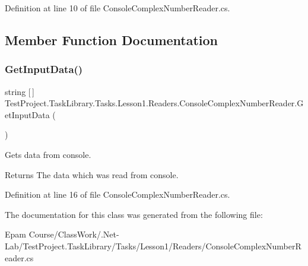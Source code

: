 Definition at line 10 of file Console\+Complex\+Number\+Reader.\+cs.



\subsection{Member Function Documentation}
\mbox{\label{class_test_project_1_1_task_library_1_1_tasks_1_1_lesson1_1_1_readers_1_1_console_complex_number_reader_aab6af1e87e0e2b0744c86baa86fe7da7}} 
\subsubsection{\texorpdfstring{GetInputData()}{GetInputData()}}
{\footnotesize\ttfamily string \mbox{[}$\,$\mbox{]} Test\+Project.\+Task\+Library.\+Tasks.\+Lesson1.\+Readers.\+Console\+Complex\+Number\+Reader.\+Get\+Input\+Data (\begin{DoxyParamCaption}{ }\end{DoxyParamCaption})}



Gets data from console. 

\begin{DoxyReturn}{Returns}
The data which was read from console.
\end{DoxyReturn}


Definition at line 16 of file Console\+Complex\+Number\+Reader.\+cs.



The documentation for this class was generated from the following file\+:\begin{DoxyCompactItemize}
\item 
Epam Course/\+Class\+Work/.\+Net-\/\+Lab/\+Test\+Project.\+Task\+Library/\+Tasks/\+Lesson1/\+Readers/Console\+Complex\+Number\+Reader.\+cs\end{DoxyCompactItemize}
